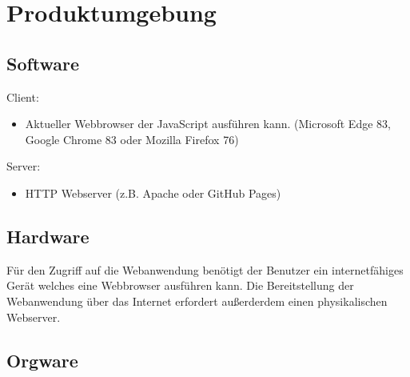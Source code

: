 \section{Produktumgebung}

\subsection{Software}

Client:
\begin{itemize}
    \item Aktueller \gls{Webbrowser} der JavaScript ausführen kann. (Microsoft Edge 83, Google Chrome 83 oder Mozilla Firefox 76)
\end{itemize}
Server:
\begin{itemize}
    \item HTTP \gls{Webserver} (z.B. Apache oder GitHub Pages)
\end{itemize}

\subsection{Hardware}

Für den Zugriff auf die \gls{Webanwendung} benötigt der Benutzer ein internetfähiges Gerät welches eine \gls{Webbrowser} ausführen kann.  
Die Bereitstellung der \gls{Webanwendung} über das Internet erfordert außerderdem einen physikalischen \gls{Webserver}.

\subsection{Orgware}

